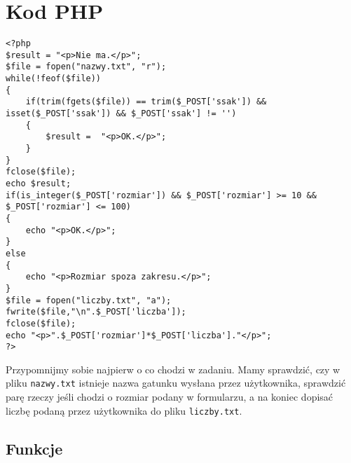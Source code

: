 \documentclass [a4paper, 10pt, oneside]{article}
\begin{document}
\section{Kod PHP}
\begin{lstlisting}
<?php
$result = "<p>Nie ma.</p>";
$file = fopen("nazwy.txt", "r");
while(!feof($file))
{
    if(trim(fgets($file)) == trim($_POST['ssak']) && isset($_POST['ssak']) && $_POST['ssak'] != '')
    {
        $result =  "<p>OK.</p>";
    }
}
fclose($file);
echo $result;
if(is_integer($_POST['rozmiar']) && $_POST['rozmiar'] >= 10 && $_POST['rozmiar'] <= 100)
{
    echo "<p>OK.</p>";
}
else
{
    echo "<p>Rozmiar spoza zakresu.</p>";
}
$file = fopen("liczby.txt", "a");
fwrite($file,"\n".$_POST['liczba']);
fclose($file);
echo "<p>".$_POST['rozmiar']*$_POST['liczba']."</p>";
?>
\end{lstlisting}

Przypomnijmy sobie najpierw o co chodzi w zadaniu. Mamy sprawdzić, czy w pliku \texttt{nazwy.txt} istnieje nazwa gatunku wysłana przez użytkownika, sprawdzić parę rzeczy jeśli chodzi o rozmiar podany w formularzu, a na koniec dopisać liczbę podaną przez użytkownika do pliku \texttt{liczby.txt}.

\subsection{Funkcje}
\end{document}
